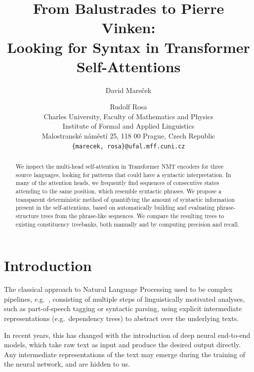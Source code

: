 \documentclass[11pt,a4paper]{article}
\title{From Balustrades to Pierre Vinken:\\Looking for Syntax in Transformer Self-Attentions}
\author{David Mare\v{c}ek \and Rudolf Rosa\\
  Charles University, Faculty of Mathematics and Physics \\
  Institute of Formal and Applied Linguistics \\
  Malostransk\' e n\' am\v est\' i 25, 118 00 Prague, Czech Republic \\
  \texttt{\{marecek, rosa\}@ufal.mff.cuni.cz}}
\date{}
\newcommand\eg{e.g.\ }
\def\RR#1{{\color{blue}RR: \it #1}}
\def\JL#1{{\color{magenta}JL: \it #1}}
\def\JL#1{}
\def\RR#1{}
\begin{document}
\maketitle
\begin{abstract}
We inspect the multi-head self-attention in Transformer NMT encoders for three source languages, looking for patterns that could have a syntactic interpretation. In many of the attention heads, we frequently find sequences of consecutive states attending to the same position, which resemble syntactic phrases.
We propose a transparent deterministic method of quantifying the amount of syntactic information present in the self-attentions,
based on automatically building and evaluating phrase-structure trees from the phrase-like sequences.
We compare the resulting trees to existing constituency treebanks, both manually and by computing precision and recall.
\end{abstract}

\section{Introduction}



The classical approach to Natural Language Processing used to be complex
pipelines, e.g.~\cite{tectomt:2010, manning:2014, apertium:2011},
consisting of multiple steps of linguistically motivated analyses,
such as part-of-speech tagging or syntactic parsing, using explicit
intermediate representations (\eg dependency trees) to abstract over the underlying texts.

In recent years, this has changed with the introduction of deep neural
end-to-end models, which take raw text as input and produce the desired
output directly. Any intermediate representations of the text
may
emerge during the training of the neural
network, and are hidden to us.
\end{document}
